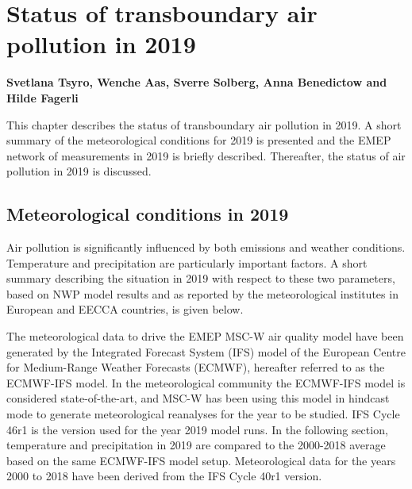 \chapter[Status in 2019]{Status of transboundary air pollution in 2019}
\label{ch:chapterStatus}

{\bf{Svetlana Tsyro, Wenche Aas, Sverre Solberg, Anna Benedictow and Hilde Fagerli}}
\vspace{30pt}

This chapter describes the status of transboundary air pollution in 2019. A short summary of the meteorological conditions for 2019 is presented and the EMEP network of measurements in 2019 is briefly described. Thereafter, the status of air pollution in 2019 is discussed.

\section{Meteorological conditions in 2019}
\label{sec:meteo}
Air pollution is significantly influenced by both emissions and weather conditions. Temperature and precipitation are particularly important factors. A short summary describing the situation in 2019 with respect to these two parameters, based on NWP model results and as reported by the meteorological institutes in European and EECCA countries, is given below.

The meteorological data to drive the EMEP MSC-W air quality model have been generated by the Integrated Forecast System (IFS) model of the European Centre for Medium-Range Weather Forecasts (ECMWF), hereafter referred to as the ECMWF-IFS model. In the meteorological community the ECMWF-IFS model is considered state-of-the-art, and MSC-W has been using this model in hindcast mode to generate meteorological reanalyses for the year to be studied. IFS Cycle 46r1 is the version used for the year 2019 model runs. In the following section, temperature and precipitation in 2019 are compared to the 2000-2018 average based on the same ECMWF-IFS model setup. Meteorological data for the years 2000 to 2018 have been derived from the IFS Cycle 40r1 version.

